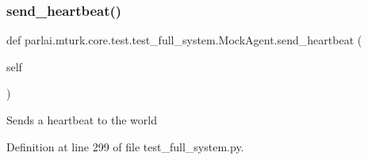 \subsubsection{\texorpdfstring{send\+\_\+heartbeat()}{send\_heartbeat()}}
{\footnotesize\ttfamily def parlai.\+mturk.\+core.\+test.\+test\+\_\+full\+\_\+system.\+Mock\+Agent.\+send\+\_\+heartbeat (\begin{DoxyParamCaption}\item[{}]{self }\end{DoxyParamCaption})}

\begin{DoxyVerb}Sends a heartbeat to the world\end{DoxyVerb}
 

Definition at line 299 of file test\+\_\+full\+\_\+system.\+py.



